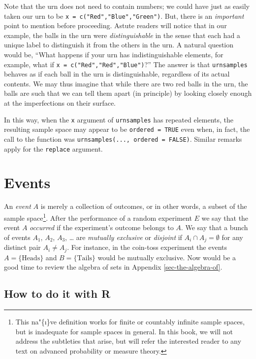 \documentclass[]{book}
\let\rmarkdownfootnote\footnote%
\def\footnote{\protect\rmarkdownfootnote}
\numberwithin{equation}{chapter}
\numberwithin{figure}{chapter}
\theoremstyle{plain}
\theoremstyle{definition}
\theoremstyle{remark}
\theoremstyle{definition}
\theoremstyle{definition}
\theoremstyle{remark}
\begin{document}
Note that the urn does not need to contain numbers; we could have just
as easily taken our urn to be \texttt{x\ =\ c("Red","Blue","Green")}.
But, there is an \emph{important} point to mention before proceeding.
Astute readers will notice that in our example, the balls in the urn
were \emph{distinguishable} in the sense that each had a unique label to
distinguish it from the others in the urn. A natural question would be,
``What happens if your urn has indistinguishable elements, for example,
what if \texttt{x\ =\ c("Red","Red","Blue")}?'' The answer is that
\texttt{urnsamples} behaves as if each ball in the urn is
distinguishable, regardless of its actual contents. We may thus imagine
that while there are two red balls in the urn, the balls are such that
we can tell them apart (in principle) by looking closely enough at the
imperfections on their surface.

In this way, when the \texttt{x} argument of \texttt{urnsamples} has
repeated elements, the resulting sample space may appear to be
\texttt{ordered\ =\ TRUE} even when, in fact, the call to the function
was \texttt{urnsamples(...,\ ordered\ =\ FALSE)}. Similar remarks apply
for the \texttt{replace} argument.

\section{Events}\label{sec-events}

An \emph{event}  \(A\) is merely a collection of outcomes,
or in other words, a subset of the sample space\footnote{This
  na"\{\i\}ve definition works for finite or countably infinite sample
  spaces, but is inadequate for sample spaces in general. In this book,
  we will not address the subtleties that arise, but will refer the
  interested reader to any text on advanced probability or measure
  theory.}. After the performance of a random experiment \(E\) we say
that the event \(A\) \emph{occurred} if the experiment's outcome belongs
to \(A\). We say that a bunch of events \(A_{1}\), \(A_{2}\), \(A_{3}\),
\ldots{} are \emph{mutually exclusive}  or
\emph{disjoint} if \(A_{i}\cap A_{j}=\emptyset\) for any distinct pair
\(A_{i}\neq A_{j}\). For instance, in the coin-toss experiment the
events \(A = \{ \mbox{Heads} \}\) and \(B = \{ \mbox{Tails} \}\) would
be mutually exclusive. Now would be a good time to review the algebra of
sets in Appendix \ref{sec-the-algebra-of}.

\subsection{How to do it with R}\label{how-to-do-it-with-r-10}
\end{document}
